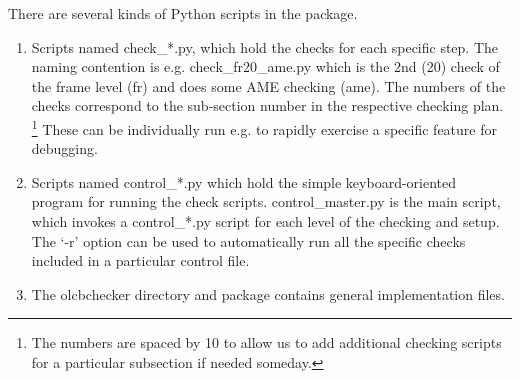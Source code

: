 There are several kinds of Python scripts in the package.
\begin{enumerate}
\item Scripts named check\_*.py, which hold the checks for each specific step.
    The naming contention is e.g. check\_fr20\_ame.py which is the 2nd (20)
    check of the frame level (fr) and does some AME checking (ame).
    The numbers of the checks correspond to the sub-section number in the 
    respective checking plan.
    \footnote{The numbers are spaced by 10 to allow us to add additional
        checking scripts for a particular subsection if needed someday.}
    These can be individually run e.g. to rapidly exercise a specific feature for debugging.
\item Scripts named control\_*.py which hold the simple keyboard-oriented
    program for running the check scripts.  control\_master.py is the
    main script, which invokes a control\_*.py script for each level of the
    checking and setup. The `-r' option can be used to automatically
    run all the specific checks included in a particular control file.
\item The olcbchecker directory and package contains general implementation
    files.
\end{enumerate}




